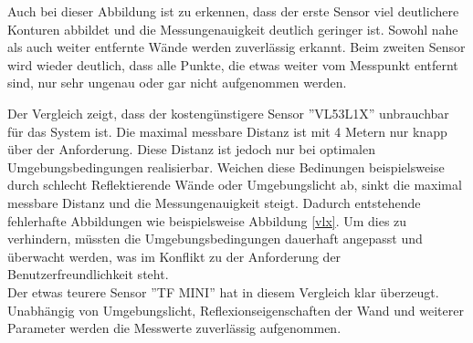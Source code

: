 Auch bei dieser Abbildung ist zu erkennen, dass der erste Sensor viel deutlichere Konturen abbildet und die Messungenauigkeit deutlich geringer ist. Sowohl nahe als auch weiter entfernte Wände werden zuverlässig erkannt. Beim zweiten Sensor wird wieder deutlich, dass alle Punkte, die etwas weiter vom Messpunkt entfernt sind, nur sehr ungenau oder gar nicht aufgenommen werden. 

Der Vergleich zeigt, dass der kostengünstigere Sensor ''VL53L1X'' unbrauchbar für das System ist. Die maximal messbare Distanz ist mit 4 Metern nur knapp über der Anforderung. Diese Distanz ist jedoch nur bei optimalen Umgebungsbedingungen realisierbar. Weichen diese Bedinungen beispielsweise durch schlecht Reflektierende Wände oder Umgebungslicht ab, sinkt die maximal messbare Distanz und die Messungenauigkeit steigt.  Dadurch entstehende fehlerhafte Abbildungen wie beispielsweise Abbildung \ref*{vlx}. Um dies zu verhindern, müssten die Umgebungsbedingungen dauerhaft angepasst und überwacht werden, was im Konflikt zu der Anforderung der Benutzerfreundlichkeit steht.\\

Der etwas teurere Sensor ''TF MINI'' hat in diesem Vergleich klar überzeugt. Unabhängig von Umgebungslicht, Reflexionseigenschaften der Wand und weiterer Parameter werden die Messwerte zuverlässig aufgenommen. 







